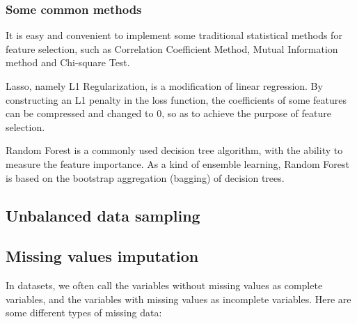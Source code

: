 \subsubsection{Some common methods}
 It is easy and convenient to implement some traditional statistical methods for feature selection, such as Correlation Coefficient Method, Mutual Information method and Chi-square Test.

 Lasso, namely L1 Regularization, is a modification of linear regression. By constructing an L1 penalty in the loss function, the coefficients of some features can be compressed and changed to 0, so as to achieve the purpose of feature selection. 

 Random Forest is a commonly used decision tree algorithm, with the ability to measure the feature importance. As a kind of ensemble learning, Random Forest is based on the bootstrap aggregation (bagging) of decision trees.


\subsection{Unbalanced data sampling} %


\subsection{Missing values imputation} %
In datasets, we often call the variables without missing values as complete variables, and the variables with missing values as incomplete variables. Here are some different types of missing data:

